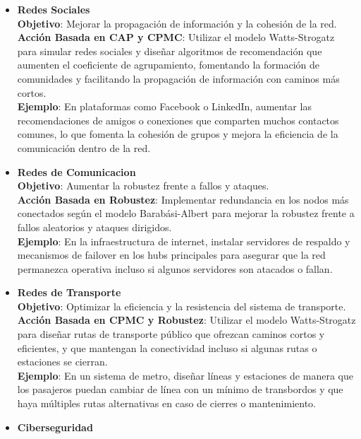 \begin{itemize}
    \item \textbf{Redes Sociales}\\
        \textbf{Objetivo}: Mejorar la propagación de información y la cohesión de la red.\\
        \textbf{Acción Basada en CAP y CPMC}: Utilizar el modelo Watts-Strogatz para simular redes sociales y diseñar algoritmos de recomendación que aumenten el coeficiente de agrupamiento, fomentando la formación de comunidades y facilitando la propagación de información con caminos más cortos.\\
        \textbf{Ejemplo}: En plataformas como Facebook o LinkedIn, aumentar las recomendaciones de amigos o conexiones que comparten muchos contactos comunes, lo que fomenta la cohesión de grupos y mejora la eficiencia de la comunicación dentro de la red.\\
    \item \textbf{Redes de Comunicacion}\\
        \textbf{Objetivo}: Aumentar la robustez frente a fallos y ataques.\\
        \textbf{Acción Basada en Robustez}: Implementar redundancia en los nodos más conectados según el modelo Barabási-Albert para mejorar la robustez frente a fallos aleatorios y ataques dirigidos.\\
        \textbf{Ejemplo}: En la infraestructura de internet, instalar servidores de respaldo y mecanismos de failover en los hubs principales para asegurar que la red permanezca operativa incluso si algunos servidores son atacados o fallan.\\
    \item \textbf{Redes de Transporte}\\
        \textbf{Objetivo}: Optimizar la eficiencia y la resistencia del sistema de transporte.\\
        \textbf{Acción Basada en CPMC y Robustez}: Utilizar el modelo Watts-Strogatz para diseñar rutas de transporte público que ofrezcan caminos cortos y eficientes, y que mantengan la conectividad incluso si algunas rutas o estaciones se cierran.\\
        \textbf{Ejemplo}: En un sistema de metro, diseñar líneas y estaciones de manera que los pasajeros puedan cambiar de línea con un mínimo de transbordos y que haya múltiples rutas alternativas en caso de cierres o mantenimiento.\\
    \item \textbf{Ciberseguridad}\\

\end{itemize}
